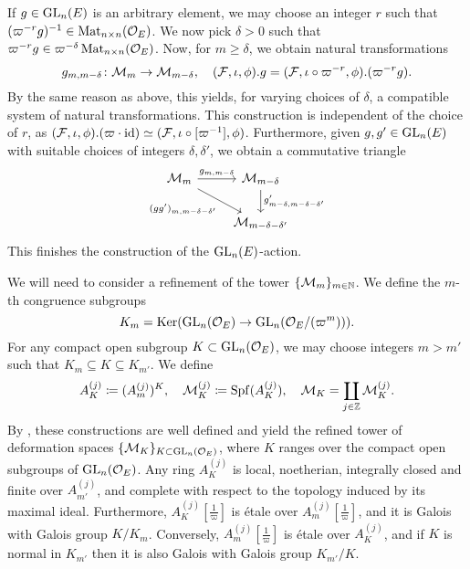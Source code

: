 \documentclass[../main.tex]{subfiles}
\begin{document}
If $g \in \operatorname{GL}_n(E)$ is an arbitrary element, we may choose an integer $r$ such
that $(\varpi^{-r} g)^{-1} \in \operatorname{Mat}_{n \times n}(\mathcal{O}_E)$. We now pick $\delta > 0$ such that $\varpi^{-r}g \in \varpi^{-\delta}\operatorname{Mat}_{n \times n}(\mathcal{O}_E)$. 
Now, for $m \geq \delta$, we obtain natural transformations
\begin{equation*}
  g_{m,m-\delta}\colon \mathcal{M}_{m} \to \mathcal{M}_{m-\delta}, \quad (\mathcal{F}, \iota, \phi).g = (\mathcal{F}, \iota \circ \varpi^{-r}, \phi).(\varpi^{-r}g).
\end{equation*}
By the same reason as above, this yields, for varying choices of $\delta$, a
compatible system of natural transformations.
This construction is independent of the choice of $r$, as $(\mathcal{F}, \iota,
\phi).(\varpi\cdot\operatorname{id}) \simeq (\mathcal{F}, \iota \circ [\varpi^{-1}], \phi)$.
Furthermore, given $g, g' \in \operatorname{GL}_n(E)$ with suitable choices of integers 
$\delta, \delta'$, we obtain a commutative triangle
\begin{equation*}
\begin{tikzcd}[ampersand replacement=\&]
	{\cM_{m}} \& {\cM_{m-\delta}} \\
	\& {\cM_{m-\delta-\delta'}}
	\arrow["{g_{m,m-\delta}}", from=1-1, to=1-2]
	\arrow["{(gg')_{m,m-\delta-\delta'}}"', from=1-1, to=2-2]
	\arrow["{g'_{m-\delta,m-\delta-\delta'}}", from=1-2, to=2-2]
\end{tikzcd}
\end{equation*}
This finishes the construction of the $\operatorname{GL}_n(E)$-action.

We will need to consider a refinement of the tower $\{\mathcal{M}_m\}_{m \in \mathbb{N}}$. We
define the 
$m$-th congruence subgroups
\begin{equation}\label{eq:defCongruenceSubgroup}
  K_m = \operatorname{Ker}(\operatorname{GL}_n(\mathcal{O}_E) \to \operatorname{GL}_n(\mathcal{O}_E/(\varpi^m))).
\end{equation}
For any compact open subgroup $K \subset \operatorname{GL}_n(\mathcal{O}_E)$, we may choose integers
$m > m'$ such that $K_m \subseteq K \subseteq K_{m'}$. We define 
\begin{equation*}
  A_K^{(j)} \coloneq (A^{(j)}_m)^K, \quad \mathcal{M}_K^{(j)} \coloneq \operatorname{Spf}(A_K^{(j)}), \quad
  \mathcal{M}_K = \coprod_{j \in \mathbb{Z}} \mathcal{M}_K^{(j)}.
\end{equation*}
By \cite[Proposition 2.2.5]{Strauch2008DefSp}, these constructions are well defined
and yield the refined tower of deformation spaces
$\{\mathcal{M}_K\}_{K \subset \operatorname{GL}_n(\mathcal{O}_E)}$, where $K$ ranges over 
the compact open subgroups of $\operatorname{GL}_n(\mathcal{O}_E)$. Any ring
$A_K^{(j)}$ is local, noetherian, integrally closed and finite over
$A_{m'}^{(j)}$, and complete with respect to the topology induced by its maximal ideal.
Furthermore,
$A_{K}^{(j)}[\tfrac 1 \varpi]$ is \'etale over $A_{m}^{(j)}[\tfrac 1 \varpi]$, 
and it is Galois with Galois group $K/K_m$. Conversely, $A_{m}^{(j)}[\tfrac 1 \varpi]$
is \'etale over $A_K^{(j)}$, and if $K$ is normal in $K_{m'}$ then it is also
Galois with Galois group $K_{m'}/K$. 
\end{document}

